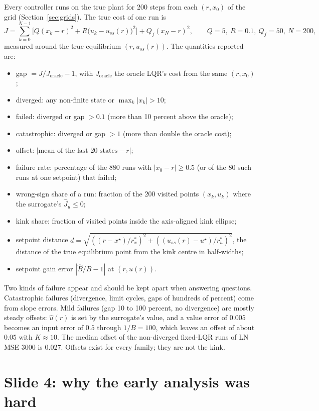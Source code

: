 \documentclass[11pt]{article}
\begin{document}
Every controller runs on the true plant for 200 steps from each $(r,x_0)$ of the grid (Section~\ref{sec:grids}). The true cost of one run is
\begin{equation}
J = \sum_{k=0}^{N-1}\Big[Q(x_k-r)^2 + R\big(u_k-u_{ss}(r)\big)^2\Big] + Q_f(x_N-r)^2,\qquad Q=5,\ R=0.1,\ Q_f=50,\ N=200,
\end{equation}
measured around the true equilibrium $(r,u_{ss}(r))$. The quantities reported are:
\begin{itemize}
\item gap $=J/J_{\text{oracle}}-1$, with $J_{\text{oracle}}$ the oracle LQR's cost from the same $(r,x_0)$;
\item diverged: any non-finite state or $\max_k|x_k|>10$;
\item failed: diverged or gap $>0.1$ (more than 10 percent above the oracle);
\item catastrophic: diverged or gap $>1$ (more than double the oracle cost);
\item offset: $|\text{mean of the last 20 states} - r|$;
\item failure rate: percentage of the 880 runs with $|x_0-r|\ge0.5$ (or of the 80 such runs at one setpoint) that failed;
\item wrong-sign share of a run: fraction of the 200 visited points $(x_k,u_k)$ where the surrogate's $\hat J_u\le0$;
\item kink share: fraction of visited points inside the axis-aligned kink ellipse;
\item setpoint distance $d=\sqrt{((r-x^\star)/r^*_x)^2+((u_{ss}(r)-u^\star)/r^*_u)^2}$, the distance of the true equilibrium point from the kink centre in half-widths;
\item setpoint gain error $|\hat B/B-1|$ at $(r,\hat u(r))$.
\end{itemize}
Two kinds of failure appear and should be kept apart when answering questions. Catastrophic failures (divergence, limit cycles, gaps of hundreds of percent) come from slope errors. Mild failures (gap 10 to 100 percent, no divergence) are mostly steady offsets: $\hat u(r)$ is set by the surrogate's value, and a value error of $0.005$ becomes an input error of $0.5$ through $1/B=100$, which leaves an offset of about $0.05$ with $K\approx10$. The median offset of the non-diverged fixed-LQR runs of LN MSE 3000 is 0.027. Offsets exist for every family; they are not the kink.

\section{Slide 4: why the early analysis was hard}\label{sec:s2}
\end{document}
